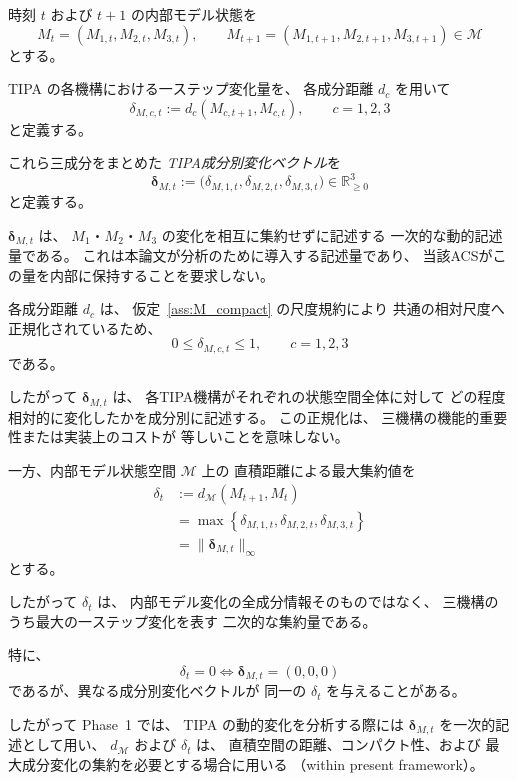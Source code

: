 \begin{definition}
\label{def:tipa_component_change}

時刻 $t$ および $t+1$ の内部モデル状態を
\[
  M_t
  =
  (M_{1,t},M_{2,t},M_{3,t}),
  \qquad
  M_{t+1}
  =
  (M_{1,t+1},M_{2,t+1},M_{3,t+1})
  \in\mathcal{M}
\]
とする。

TIPA の各機構における一ステップ変化量を、
各成分距離 $d_c$ を用いて
\[
  \delta_{M,c,t}
  :=
  d_c(M_{c,t+1},M_{c,t}),
  \qquad
  c=1,2,3
\]
と定義する。

これら三成分をまとめた
\emph{TIPA成分別変化ベクトル}を
\[
  \boldsymbol{\delta}_{M,t}
  :=
  \bigl(
    \delta_{M,1,t},
    \delta_{M,2,t},
    \delta_{M,3,t}
  \bigr)
  \in\mathbb{R}_{\geq0}^{3}
\]
と定義する。

$\boldsymbol{\delta}_{M,t}$ は、
$M_1$・$M_2$・$M_3$ の変化を相互に集約せずに記述する
一次的な動的記述量である。
これは本論文が分析のために導入する記述量であり、
当該ACSがこの量を内部に保持することを要求しない。

各成分距離 $d_c$ は、
仮定~\ref{ass:M_compact} の尺度規約により
共通の相対尺度へ正規化されているため、
\[
  0\leq\delta_{M,c,t}\leq1,
  \qquad
  c=1,2,3
\]
である。

したがって
$\boldsymbol{\delta}_{M,t}$ は、
各TIPA機構がそれぞれの状態空間全体に対して
どの程度相対的に変化したかを成分別に記述する。
この正規化は、
三機構の機能的重要性または実装上のコストが
等しいことを意味しない。

一方、内部モデル状態空間 $\mathcal{M}$ 上の
直積距離による最大集約値を
\[
\begin{aligned}
  \delta_t
  &:=
  d_{\mathcal{M}}(M_{t+1},M_t)\\
  &=
  \max\left\{
    \delta_{M,1,t},
    \delta_{M,2,t},
    \delta_{M,3,t}
  \right\}\\
  &=
  \|\boldsymbol{\delta}_{M,t}\|_{\infty}
\end{aligned}
\]
とする。

したがって $\delta_t$ は、
内部モデル変化の全成分情報そのものではなく、
三機構のうち最大の一ステップ変化を表す
二次的な集約量である。

特に、
\[
  \delta_t=0
  \iff
  \boldsymbol{\delta}_{M,t}=(0,0,0)
\]
であるが、異なる成分別変化ベクトルが
同一の $\delta_t$ を与えることがある。

したがって Phase~1 では、
TIPA の動的変化を分析する際には
$\boldsymbol{\delta}_{M,t}$ を一次的記述として用い、
$d_{\mathcal{M}}$ および $\delta_t$ は、
直積空間の距離、コンパクト性、および
最大成分変化の集約を必要とする場合に用いる
（within present framework）。
\end{definition}


